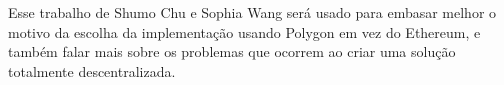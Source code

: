 \documentclass[
	12pt,				 %
	oneside,			 %
	a4paper,			 %
	chapter=TITLE,		 %
	section=TITLE,		 %
	sumario=tradicional, %
	english,			 %
	french,				 %
	spanish,			 %
	brazil				 %
	]{abntex2}
\begin{document}
\cite{curses_of_blockchain}
Esse trabalho de Shumo Chu e Sophia Wang será usado para embasar melhor o motivo da escolha da implementação usando Polygon em vez do Ethereum, e também falar mais sobre os problemas que ocorrem ao criar uma solução totalmente descentralizada.


\printindex
\end{document}
